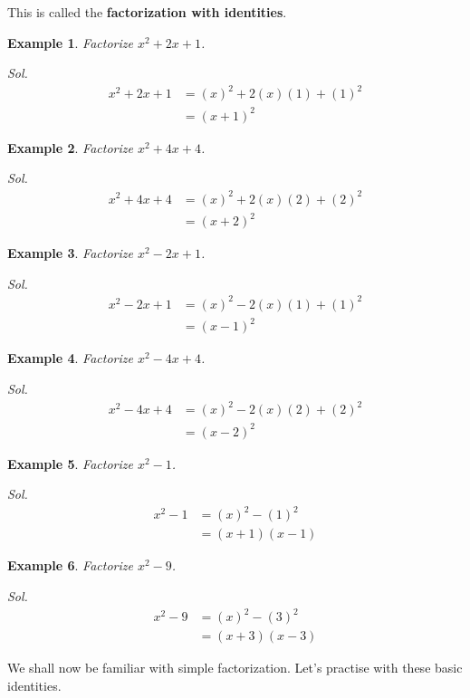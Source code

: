 \documentclass[12pt]{article}
\newtheorem{example}{Example}
\begin{document}
    This is called the \textbf{factorization with identities}.

    \begin{example}
        Factorize $x^2+2x+1$.
    \end{example}
    \textit{ Sol. }\begin{align*}
        x^2+2x+1&=(x)^2+2(x)(1)+(1)^2\\
        &=(x+1)^2
    \end{align*}

    \begin{example}
        Factorize $x^2+4x+4$.
    \end{example}
    \textit{ Sol. }\begin{align*}
        x^2+4x+4&=(x)^2+2(x)(2)+(2)^2\\
        &=(x+2)^2
    \end{align*}

    \begin{example}
        Factorize $x^2-2x+1$.
    \end{example}
    \textit{ Sol. }\begin{align*}
        x^2-2x+1&=(x)^2-2(x)(1)+(1)^2\\
        &=(x-1)^2
    \end{align*}

    \begin{example}
        Factorize $x^2-4x+4$.
    \end{example}
    \textit{ Sol. }\begin{align*}
        x^2-4x+4&=(x)^2-2(x)(2)+(2)^2\\
        &=(x-2)^2
    \end{align*}

    \begin{example}
        Factorize $x^2-1$.
    \end{example}
    \textit{ Sol. }\begin{align*}
        x^2-1&=(x)^2-(1)^2\\
        &=(x+1)(x-1)
    \end{align*}

    \begin{example}
        Factorize $x^2-9$.
    \end{example}
    \textit{ Sol. }\begin{align*}
        x^2-9&=(x)^2-(3)^2\\
        &=(x+3)(x-3)
    \end{align*}

    We shall now be familiar with simple factorization. Let's practise with these basic identities.
\end{document}
